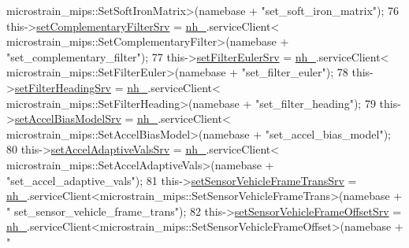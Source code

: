 \begin{DoxyCode}
      microstrain\_mips::SetSoftIronMatrix>(namebase + \textcolor{stringliteral}{"set\_soft\_iron\_matrix"});
76                 this->\hyperlink{classcl__microstrain__mips_1_1ClMicrostainMips_a54045931a06f909418ac284235c5dd5a}{setComplementaryFilterSrv} = \hyperlink{classcl__microstrain__mips_1_1ClMicrostainMips_a5a39ba0864ba2c4c003b6ea427538243}{nh\_}.serviceClient<
      microstrain\_mips::SetComplementaryFilter>(namebase + \textcolor{stringliteral}{"set\_complementary\_filter"});
77                 this->\hyperlink{classcl__microstrain__mips_1_1ClMicrostainMips_a4e88ebd03c7a774e958f8902c18e7f69}{setFilterEulerSrv} = \hyperlink{classcl__microstrain__mips_1_1ClMicrostainMips_a5a39ba0864ba2c4c003b6ea427538243}{nh\_}.serviceClient<
      microstrain\_mips::SetFilterEuler>(namebase + \textcolor{stringliteral}{"set\_filter\_euler"});
78                 this->\hyperlink{classcl__microstrain__mips_1_1ClMicrostainMips_abe64faba505dfdab0b78b7cf31f9609d}{setFilterHeadingSrv} = \hyperlink{classcl__microstrain__mips_1_1ClMicrostainMips_a5a39ba0864ba2c4c003b6ea427538243}{nh\_}.serviceClient<
      microstrain\_mips::SetFilterHeading>(namebase + \textcolor{stringliteral}{"set\_filter\_heading"});
79                 this->\hyperlink{classcl__microstrain__mips_1_1ClMicrostainMips_a8d7c0f0a94dd6a25cac0130f8d9f55ff}{setAccelBiasModelSrv} = \hyperlink{classcl__microstrain__mips_1_1ClMicrostainMips_a5a39ba0864ba2c4c003b6ea427538243}{nh\_}.serviceClient<
      microstrain\_mips::SetAccelBiasModel>(namebase + \textcolor{stringliteral}{"set\_accel\_bias\_model"});
80                 this->\hyperlink{classcl__microstrain__mips_1_1ClMicrostainMips_a0e22727b68e51261aa65605f236419e6}{setAccelAdaptiveValsSrv} = \hyperlink{classcl__microstrain__mips_1_1ClMicrostainMips_a5a39ba0864ba2c4c003b6ea427538243}{nh\_}.serviceClient<
      microstrain\_mips::SetAccelAdaptiveVals>(namebase + \textcolor{stringliteral}{"set\_accel\_adaptive\_vals"});
81                 this->\hyperlink{classcl__microstrain__mips_1_1ClMicrostainMips_ac020b44e78addaa26beb44081d99f194}{setSensorVehicleFrameTransSrv} = 
      \hyperlink{classcl__microstrain__mips_1_1ClMicrostainMips_a5a39ba0864ba2c4c003b6ea427538243}{nh\_}.serviceClient<microstrain\_mips::SetSensorVehicleFrameTrans>(namebase + \textcolor{stringliteral}{"
      set\_sensor\_vehicle\_frame\_trans"});
82                 this->\hyperlink{classcl__microstrain__mips_1_1ClMicrostainMips_a977cce1917e12d96f614266baa4ae55d}{setSensorVehicleFrameOffsetSrv} = 
      \hyperlink{classcl__microstrain__mips_1_1ClMicrostainMips_a5a39ba0864ba2c4c003b6ea427538243}{nh\_}.serviceClient<microstrain\_mips::SetSensorVehicleFrameOffset>(namebase + \textcolor{stringliteral}{"
}
\end{DoxyCode}
